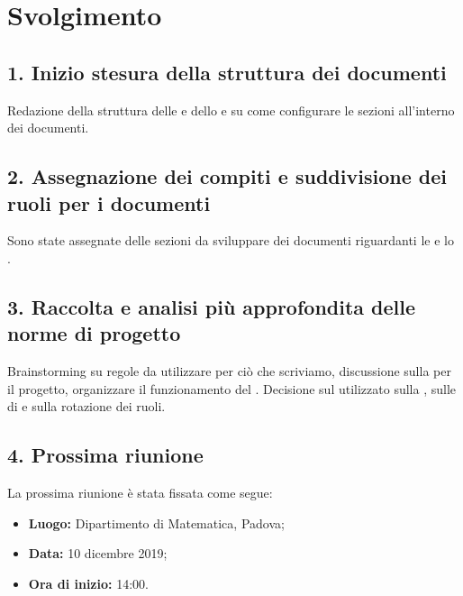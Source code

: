 \newpage
\section*{Svolgimento}

\subsection*{1. Inizio stesura della struttura dei documenti }

Redazione della struttura delle  e dello  e su come configurare le sezioni all'interno dei documenti.

\subsection*{2. Assegnazione dei compiti e suddivisione dei ruoli per i documenti }

Sono state assegnate delle sezioni da sviluppare dei documenti riguardanti le  e lo .

\subsection*{3. Raccolta e analisi più approfondita delle norme di progetto }

Brainstorming su regole da utilizzare per ciò che scriviamo, discussione sulla  per il progetto, organizzare il funzionamento del . Decisione sul  utilizzato sulla , sulle  di  e sulla rotazione dei ruoli.

\subsection*{4. Prossima riunione}

La prossima riunione è stata fissata come segue:
\begin{itemize}
	\item \textbf{Luogo:} Dipartimento di Matematica, Padova;
	\item \textbf{Data:} 10 dicembre 2019;
	\item \textbf{Ora di inizio:} 14:00.
\end{itemize}
